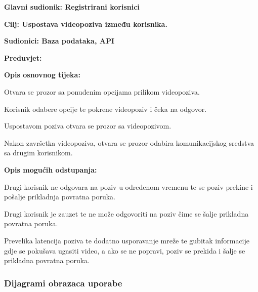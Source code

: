 					\noindent {}
					\begin{packed_item}
						
						\item \textbf{Glavni sudionik: Registrirani korisnici}
						\item  \textbf{Cilj: Uspostava videopoziva između korisnika.} 
						\item  \textbf{Sudionici: Baza podataka, API} 
						\item  \textbf{Preduvjet:} 
						\item  \textbf{Opis osnovnog tijeka:}
						
						\item[] \begin{packed_enum}
							
							\item Otvara se prozor sa ponuđenim opcijama prilikom videopoziva.
							\item Korisnik odabere opcije te pokrene videopoziv i čeka na odgovor.
							\item Uspostavom poziva otvara se prozor sa videopozivom.
							\item Nakon završetka videopoziva, otvara se prozor odabira komunikacijskog sredstva sa drugim korisnikom.
						\end{packed_enum}
						
						\item  \textbf{Opis mogućih odstupanja:}
						
						\item[] \begin{packed_item}
							
							\item[2.a] Drugi korisnik ne odgovara na poziv u određenom vremenu te se poziv prekine i pošalje prikladnja povratna poruka.
							\item[2.b] Drugi korisnik je zauzet te ne može odgovoriti na poziv čime se šalje prikladna povratna poruka. 
							\item[3.a] Prevelika latencija poziva te dodatno usporavanje mreže te gubitak informacije gdje se pokušava ugasiti video, a ako se ne popravi, poziv se prekida i šalje se prikladna povratna poruka.
							
						\end{packed_item}
					\end{packed_item}
					
					
				\subsubsection{Dijagrami obrazaca uporabe}
					
